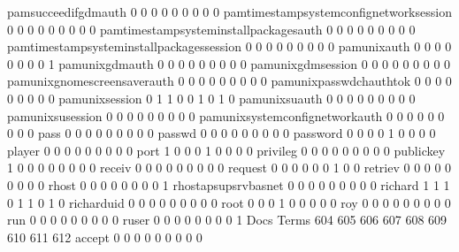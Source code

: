 \documentclass[compress,8pt]{beamer}
\begin{document}
\begin{frame}
\begin{Schunk}
  pamsucceedifgdmauth                        0   0   0   0   0   0   0   0   0
  pamtimestampsystemconfignetworksession     0   0   0   0   0   0   0   0   0
  pamtimestampsysteminstallpackagesauth      0   0   0   0   0   0   0   0   0
  pamtimestampsysteminstallpackagessession   0   0   0   0   0   0   0   0   0
  pamunixauth                                0   0   0   0   0   0   0   0   1
  pamunixgdmauth                             0   0   0   0   0   0   0   0   0
  pamunixgdmsession                          0   0   0   0   0   0   0   0   0
  pamunixgnomescreensaverauth                0   0   0   0   0   0   0   0   0
  pamunixpasswdchauthtok                     0   0   0   0   0   0   0   0   0
  pamunixsession                             0   1   1   0   0   1   0   1   0
  pamunixsuauth                              0   0   0   0   0   0   0   0   0
  pamunixsusession                           0   0   0   0   0   0   0   0   0
  pamunixsystemconfignetworkauth             0   0   0   0   0   0   0   0   0
  pass                                       0   0   0   0   0   0   0   0   0
  passwd                                     0   0   0   0   0   0   0   0   0
  password                                   0   0   0   0   1   0   0   0   0
  player                                     0   0   0   0   0   0   0   0   0
  port                                       1   0   0   0   1   0   0   0   0
  privileg                                   0   0   0   0   0   0   0   0   0
  publickey                                  1   0   0   0   0   0   0   0   0
  receiv                                     0   0   0   0   0   0   0   0   0
  request                                    0   0   0   0   0   0   1   0   0
  retriev                                    0   0   0   0   0   0   0   0   0
  rhost                                      0   0   0   0   0   0   0   0   1
  rhostapsupsrvbasnet                        0   0   0   0   0   0   0   0   0
  richard                                    1   1   1   0   1   1   0   1   0
  richarduid                                 0   0   0   0   0   0   0   0   0
  root                                       0   0   0   1   0   0   0   0   0
  roy                                        0   0   0   0   0   0   0   0   0
  run                                        0   0   0   0   0   0   0   0   0
  ruser                                      0   0   0   0   0   0   0   0   1
                                          Docs
Terms                                      604 605 606 607 608 609 610 611 612
  accept                                     0   0   0   0   0   0   0   0   0

\end{Schunk}
\end{frame}
\end{document}

